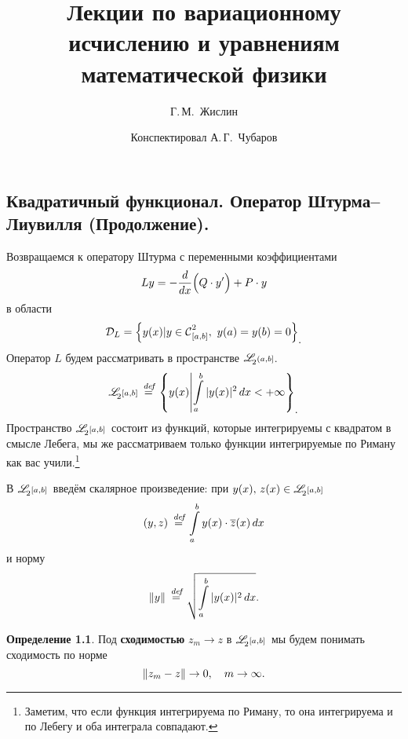 \documentclass[12pt,a4paper,openany,fleqn]{book}
\newcommand {\defeq}{\stackrel{\hspace{0.09 cm}de\!f}{=}}
\newcommand {\eqdef}{\defeq}
\newcommand{\Cf}{\ensuremath{\mathcal{C}}}
\newcommand{\mc}[1]{\ensuremath{\mathcal{#1}}}
\newcommand{\Cfn}[2][]{\ensuremath{\Cf{\mathstrut}^{#2}_{#1}}}
\newcommand{\der}[2]{\ensuremath{\frac{d#1}{d#2}}}
\newcommand{\LL}{\ensuremath{L}}
\newcommand{\fL}[1][{[a,b]}]{\ensuremath{\mathscr{L}\hspace*{-0.11 cm}{\mathstrut}_{2}{\scriptstyle#1}}}
\newcommand{\norm}[1]{\ensuremath{\|#1\|}}
\theoremstyle{definition}
\newtheorem{_def}{Определение}[section]
\begin{document}
	\author{Г.\,М.~Жислин}
	\title{Лекции по вариационному исчислению и уравнениям математической физики}
	\date{Конспектировал А.\,Г.~Чубаров}
	
	
	
	\maketitle
	
	
	\renewcommand{\thepart}{\Asbuk{part}}
	\renewcommand{\thechapter}{\arabic{chapter}}
	\renewcommand{\thesection}{\arabic{section}}
	\renewcommand{\thesubsection}{\Roman{subsection}}
	\renewcommand{\thefootnote}{\roman{footnote}}
	\renewcommand{\phi}{\varphi}
	\renewcommand{\Re}{\ensuremath{\mc{R}e\,}}
	\renewcommand{\Im}{\ensuremath{\mc{I}m\,}}
	
	\setcounter{chapter}{4}
	\chapter{}
	\label{lecture5}
	\section[Квадратичный функционал. Оператор Штурма (Продолжение). ]{Квадратичный функционал. Оператор Штурма--Лиувилля (Продолжение).}
	\label{lecture5section1}
	Возвращаемся к оператору Штурма с переменными коэффициентами
	\begin{equation}
		\label{l5:eq:1}
		\hfill \LL{}y=-\der{}{x}\Big(Q\cdot y'\Big)+P\cdot y\hfill
	\end{equation}
в области 
\begin{equation*}
		\hfill\mc{D}_{\LL}=\left\{y(x)|y\in\Cfn[{[a,b]}]{2},\ y(a)=y(b)=0\right\}_{\displaystyle.}\hfill
\end{equation*}
Оператор $\LL$ будем рассматривать в пространстве $\fL[{(a,b]}]$.
\begin{equation*}
	\hfill \fL\eqdef\left\{y(x)\middle|\int\limits_a^b|y(x)|^2\,dx<+\infty\right\}_{\displaystyle.}\hfill
\end{equation*}
Пространство \fL\ состоит из функций, которые интегрируемы с квадратом в смысле Лебега, мы же рассматриваем только функции интегрируемые по Риману как вас учили.\footnote[1]{Заметим, что если функция интегрируема по Риману, то она интегрируема и по Лебегу и оба интеграла совпадают.}

В \fL\ введём скалярное произведение: при $y(x),\,z(x)\in\fL$
\begin{equation*}
	\hfill(y,z)\eqdef\int\limits_a^b y(x)\cdot \overline{z}(x)\,dx\hfill
\end{equation*}  
и норму
\begin{equation*}
	\hfill\norm{y}\eqdef\sqrt{\int\limits_a^b|y(x)|^2\,dx}.\hfill
\end{equation*}
\begin{_def}
Под \textbf{сходимостью} $z_{m}\to z$ в \fL\ мы будем понимать сходимость по норме
\begin{equation*}
	\hfill\norm{z_m-z}\to0,\quad m\to\infty.\hfill
\end{equation*}
\end{_def}
\end{document}
